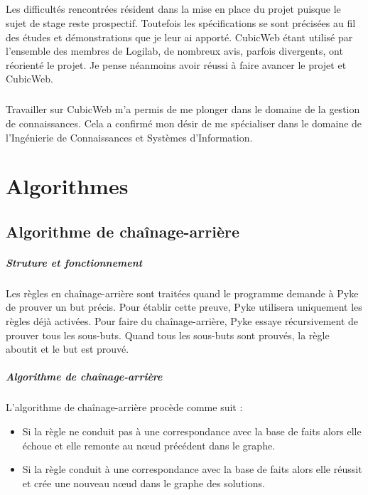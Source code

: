 \documentclass {report}
\begin{document}
\paragraph{}
Les difficultés rencontrées résident dans la mise en place du projet puisque le sujet de stage reste prospectif. Toutefois les spécifications se sont précisées au fil des études et démonstrations que je leur ai apporté. CubicWeb étant utilisé par l'ensemble des membres de Logilab, de nombreux avis, parfois divergents, ont réorienté le projet. Je pense néanmoins avoir réussi à faire avancer le projet et CubicWeb.

\paragraph{}
Travailler sur CubicWeb m'a permis de me plonger dans le domaine de la gestion de connaissances. Cela a confirmé mon désir de me spécialiser dans le domaine de l'Ingénierie de Connaissances et Systèmes d'Information.


\appendix


\chapter{Algorithmes}
\section{Algorithme de chaînage-arrière}

\paragraph{Struture et fonctionnement}
Les règles en chaînage-arrière sont traitées quand le programme demande à Pyke de prouver un but précis. Pour établir cette preuve, Pyke utilisera uniquement les règles déjà activées. Pour faire du chaînage-arrière, Pyke essaye récursivement de prouver tous les sous-buts. Quand tous les sous-buts sont prouvés, la règle aboutit et le but est prouvé.

\paragraph{Algorithme de chaînage-arrière}
    L'algorithme de chaînage-arrière procède comme suit : 
\begin{itemize}
    \item Si la règle ne conduit pas à une correspondance avec la base de faits alors elle échoue et elle remonte au nœud précédent dans le graphe.
    \item Si la règle conduit à une correspondance avec la base de faits alors elle réussit et crée une nouveau nœud dans le graphe des solutions.
\end{itemize}
\end{document}
